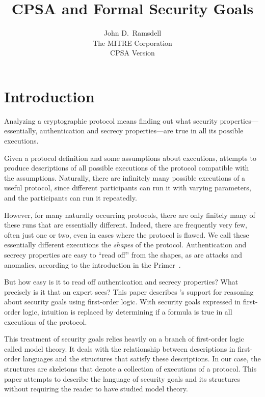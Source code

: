 \documentclass[12pt]{article}
\title{CPSA and Formal Security Goals}
\author{John D.~Ramsdell\\
  The MITRE Corporation\\ CPSA Version \version}
\begin{document}
\maketitle
\cpsacopying

\tableofcontents

\newpage

\listoffigures

\listoftables

\newpage

\section{Introduction}

\begin{sloppypar}
Analyzing a cryptographic protocol means finding out what security
properties---essentially, authentication and secrecy properties---are
true in all its possible executions.
\end{sloppypar}

Given a protocol definition and some assumptions about executions,
{\cpsa} attempts to produce descriptions of all possible executions of
the protocol compatible with the assumptions.  Naturally, there are
infinitely many possible executions of a useful protocol, since
different participants can run it with varying parameters, and the
participants can run it repeatedly.

However, for many naturally occurring protocols, there are only
finitely many of these runs that are essentially different.  Indeed,
there are frequently very few, often just one or two, even in cases
where the protocol is flawed.  We call these essentially different
executions the \emph{shapes} of the protocol.  Authentication and
secrecy properties are easy to ``read off'' from the shapes, as are
attacks and anomalies, according to the introduction in the {\cpsa}
Primer~\cite{cpsaprimer09}.

But how easy is it to read off authentication and secrecy properties?
What precisely is it that an expert sees?  This paper describes
{\cpsa}'s support for reasoning about security goals using first-order
logic.  With security goals expressed in first-order logic, intuition
is replaced by determining if a formula is true in all executions of
the protocol.


This treatment of security goals relies heavily on a branch of
first-order logic called model theory.  It deals with the relationship
between descriptions in first-order languages and the structures that
satisfy these descriptions.  In our case, the structures are skeletons
that denote a collection of executions of a protocol.  This paper
attempts to describe the language of security goals and its
structures without requiring the reader to have studied model theory.
\end{document}
